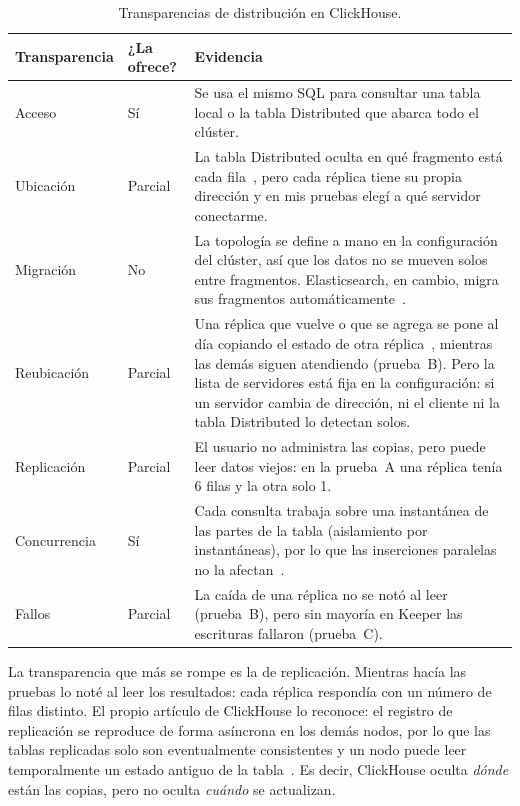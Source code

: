 \documentclass[12pt,a4paper]{article}
\begin{document}
\begin{table}[htbp]
  \centering
  \caption{Transparencias de distribución en ClickHouse.}
  \label{tab:transparencias}
  \small
  \begin{tabularx}{\linewidth}{@{}l l X@{}}
    \toprule
    \textbf{Transparencia} & \textbf{¿La ofrece?} & \textbf{Evidencia} \\
    \midrule
    Acceso & Sí & Se usa el mismo SQL para consultar una tabla local o la
      tabla Distributed que abarca todo el clúster. \\
    Ubicación & Parcial & La tabla Distributed oculta en qué fragmento está
      cada fila~\cite[p.~3732]{schulze2024}, pero cada réplica tiene su
      propia dirección y en mis pruebas elegí a qué servidor conectarme. \\
    Migración & No & La topología se define a mano en la configuración del
      clúster, así que los datos no se mueven solos entre fragmentos.
      Elasticsearch, en cambio, migra sus fragmentos
      automáticamente~\cite[p.~2377]{calderon2024}. \\
    Reubicación & Parcial & Una réplica que vuelve o que se agrega se pone al
      día copiando el estado de otra réplica~\cite[p.~3736]{schulze2024},
      mientras las demás siguen atendiendo (prueba~B). Pero la lista de
      servidores está fija en la configuración: si un servidor cambia de
      dirección, ni el cliente ni la tabla Distributed lo detectan solos. \\
    Replicación & Parcial & El usuario no administra las copias, pero puede
      leer datos viejos: en la prueba~A una réplica tenía 6 filas y la otra
      solo 1. \\
    Concurrencia & Sí & Cada consulta trabaja sobre una instantánea de las
      partes de la tabla (aislamiento por instantáneas), por lo que las
      inserciones paralelas no la afectan~\cite[p.~3736]{schulze2024}. \\
    Fallos & Parcial & La caída de una réplica no se notó al leer
      (prueba~B), pero sin mayoría en Keeper las escrituras fallaron
      (prueba~C). \\
    \bottomrule
  \end{tabularx}
\end{table}

La transparencia que más se rompe es la de replicación. Mientras hacía
las pruebas lo noté al leer los resultados: cada réplica respondía con
un número de filas distinto. El propio artículo de ClickHouse lo
reconoce: el registro de replicación se reproduce de forma asíncrona en
los demás nodos, por lo que las tablas replicadas solo son
eventualmente consistentes y un nodo puede leer temporalmente un estado
antiguo de la tabla~\cite[p.~3736]{schulze2024}. Es decir, ClickHouse
oculta \emph{dónde} están las copias, pero no oculta \emph{cuándo} se
actualizan.
\end{document}
